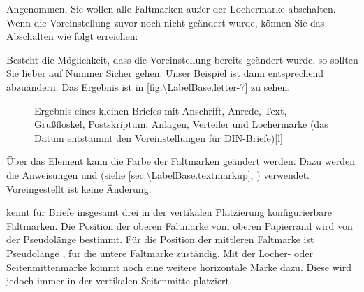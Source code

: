 \begin{Example}
  Angenommen, Sie wollen alle Faltmarken außer der Lochermarke
  abschalten. Wenn die Voreinstellung zuvor noch nicht geändert wurde, können
  Sie das Abschalten wie folgt erreichen:
\begin{lstcode}
\end{lstcode}
  Besteht die Möglichkeit, dass die Voreinstellung bereits geändert wurde, so
  sollten Sie lieber auf Nummer Sicher gehen. Unser Beispiel ist dann
  entsprechend abzuändern.%
  Das Ergebnis ist in \autoref{fig:\LabelBase.letter-7} zu sehen.
  \begin{figure}
    \setcapindent{0pt}%
    \begin{captionbeside}{Ergebnis eines kleinen Briefes mit Anschrift, Anrede,
        Text, Grußfloskel, Postskriptum, Anlagen, Verteiler und Lochermarke
        (das Datum entstammt den Voreinstellungen für DIN-Briefe)}[l]
    \end{captionbeside}
    \label{fig:\LabelBase.letter-7}
  \end{figure}
\end{Example}
%
Über das Element 
kann die Farbe der Faltmarken geändert werden. Dazu werden die Anweisungen
 und
 (siehe
\autoref{sec:\LabelBase.textmarkup}, )
verwendet. Voreingestellt ist keine Änderung.%
\EndIndexGroup


\begin{Declaration}
\end{Declaration}
\KOMAScript{} kennt für Briefe  insgesamt drei in der vertikalen
Platzierung konfigurierbare Faltmarken. Die Position der oberen Faltmarke vom
oberen Papierrand wird von der Pseudolänge 
bestimmt. Für die Position der mittleren Faltmarke ist Pseudolänge
, für die untere
Faltmarke  zuständig. Mit der
Locher- oder Seitenmittenmarke kommt noch eine weitere
horizontale Marke dazu. Diese wird jedoch immer in der vertikalen Seitenmitte
platziert. 
\iffalse%
Da ihre vertikale Position also nicht konfigurierbar ist, existiert
auch keine Pseudolänge dafür.
\fi

